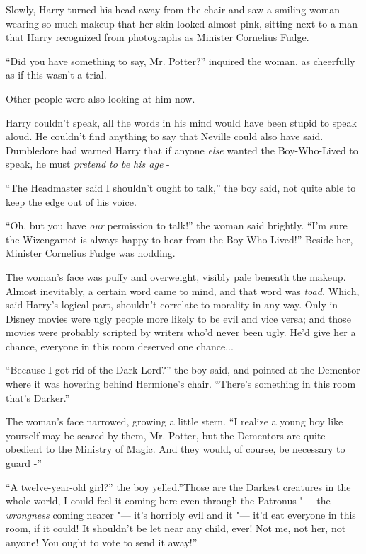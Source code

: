 Slowly, Harry turned his head away from the chair and saw a smiling
woman wearing so much makeup that her skin looked almost pink, sitting
next to a man that Harry recognized from photographs as Minister
Cornelius Fudge.

``Did you have something to say, Mr. Potter?'' inquired the woman, as
cheerfully as if this wasn't a trial.

Other people were also looking at him now.

Harry couldn't speak, all the words in his mind would have been stupid
to speak aloud. He couldn't find anything to say that Neville could also
have said. Dumbledore had warned Harry that if anyone \emph{else} wanted
the Boy-Who-Lived to speak, he must \emph{pretend to be his age} -

``The Headmaster said I shouldn't ought to talk,'' the boy said, not
quite able to keep the edge out of his voice.

``Oh, but you have \emph{our} permission to talk!'' the woman said
brightly. ``I'm sure the Wizengamot is always happy to hear from the
Boy-Who-Lived!'' Beside her, Minister Cornelius Fudge was nodding.

The woman's face was puffy and overweight, visibly pale beneath the
makeup. Almost inevitably, a certain word came to mind, and that word
was \emph{toad.} Which, said Harry's logical part, shouldn't correlate
to morality in any way. Only in Disney movies were ugly people more
likely to be evil and vice versa; and those movies were probably
scripted by writers who'd never been ugly. He'd give her a chance,
everyone in this room deserved one chance...

``Because I got rid of the Dark Lord?'' the boy said, and pointed at the
Dementor where it was hovering behind Hermione's chair. ``There's
something in this room that's Darker.''

The woman's face narrowed, growing a little stern. ``I realize a young
boy like yourself may be scared by them, Mr. Potter, but the Dementors
are quite obedient to the Ministry of Magic. And they would, of course,
be necessary to guard -''

``A twelve-year-old girl?'' the boy yelled.''Those are the Darkest
creatures in the whole world, I could feel it coming here even through
the Patronus "--- the \emph{wrongness} coming nearer "--- it's horribly evil
and it "--- it'd eat everyone in this room, if it could! It shouldn't be
let near any child, ever! Not me, not her, not anyone! You ought to vote
to send it away!''

